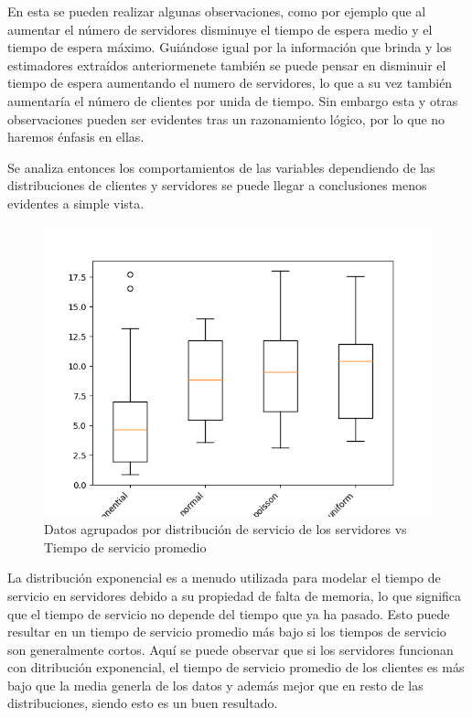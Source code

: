 \documentclass[12pt]{article}
\begin{document}
En esta se pueden realizar algunas observaciones, como por ejemplo que al aumentar el número de servidores disminuye el tiempo de espera medio y el tiempo de espera máximo. Guiándose igual por la información que brinda y los estimadores extraídos anteriormenete también se puede pensar en disminuir el tiempo de espera aumentando el numero de servidores, lo que a su vez también aumentaría el número de clientes por unida de tiempo. Sin embargo esta y otras observaciones pueden ser evidentes tras un razonamiento lógico, por lo que no haremos énfasis en ellas. 

Se analiza entonces los comportamientos de las variables dependiendo de las distribuciones de clientes y servidores se puede llegar a conclusiones menos evidentes a simple vista. 

\begin{figure}[H]
\centering
\includegraphics[width=1.2\textwidth]{tiempo x servicio.png}
\caption{Datos agrupados por distribución de servicio de los servidores vs Tiempo de servicio promedio}
\end{figure}

La distribución exponencial es a menudo utilizada para modelar el tiempo de servicio en servidores debido a su propiedad de falta de memoria, lo que significa que el tiempo de servicio no depende del tiempo que ya ha pasado. Esto puede resultar en un tiempo de servicio promedio más bajo si los tiempos de servicio son generalmente cortos. Aquí se puede observar que si los servidores funcionan con ditribución exponencial, el tiempo de servicio promedio de los clientes es más bajo que la media generla de los datos y además mejor que en resto de las distribuciones, siendo esto es un buen resultado.
\end{document}
